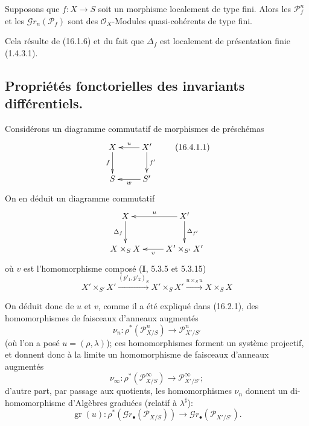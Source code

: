 \begin{proposition}[16.3.9]
\label{IV.16.3.9}
Supposons que $f:X\to S$ soit un morphisme localement de type fini. Alors les
$\mathscr{P}_f^n$ et les $\mathscr{G}r_n(\mathscr{P}_f)$ sont des
$\mathcal{O}_X$-Modules quasi-cohérents de type fini.
\end{proposition}

Cela résulte de (16.1.6) et du fait que $\Delta_f$ est localement de présentation
finie (1.4.3.1).

\subsection{Propriétés fonctorielles des invariants différentiels.}

\begin{env}[16.4.1]
\label{IV.16.4.1}
Considérons un diagramme commutatif de morphismes de préschémas
\[
  \xymatrix{
    X \ar[d]_-{f} & X' \ar[l]_-u \ar[d]^-{f'} \\
    S & S' \ar[l]^-w
  }
  \tag{16.4.1.1}
  \label{IV.16.4.1.1}
\]
On en déduit un diagramme commutatif
\[
  \xymatrix{
    X \ar[d]_-{\Delta_f} & X' \ar[l]_-u \ar[d]^-{\Delta_{f'}} \\
    X\times_S X & X'\times_{S'}X' \ar[l]^-v
  }
\]
où $v$ est l'homomorphisme composé (\textbf{I}, 5.3.5 et 5.3.15)
\[
  X'\times_{S'}X'
  \xrightarrow{(p'_1,p'_2)_S}X'\times_S X'
  \xrightarrow{u\times_S u}X\times_S X
  \tag{16.4.1.2}
  \label{IV.16.4.1.2}
\]

On déduit donc de $u$ et $v$, comme il a été expliqué dans (16.2.1), des
homomorphismes de faisceaux d'anneaux augmentés
\[
  \nu_n:\rho^*(\mathscr{P}_{X/S}^n)\longrightarrow
  \mathscr{P}_{X'/S'}^n
  \tag{16.4.1.3}
  \label{IV.16.4.1.3}
\]
(où l'on a posé $u=(\rho,\lambda)$); ces homomorphismes forment un système
projectif, et donnent donc à la limite un homomorphisme de faisceaux d'anneaux
augmentés
\[
  \nu_\infty:\rho^*(\mathscr{P}_{X/S}^\infty)\longrightarrow
  \mathscr{P}_{X'/S'}^\infty;
  \tag{16.4.1.4}
  \label{IV.16.4.1.4}
\]
d'autre part, par passage aux quotients, les homomorphismes $\nu_n$ donnent un
di-homomorphisme d'Algèbres graduées (relatif à $\lambda^\sharp$):
\[
  \operatorname{gr}(u):\rho^*(\mathscr{G}r_\bullet(\mathscr{P}_{X/S}))
  \longrightarrow\mathscr{G}r_\bullet(\mathscr{P}_{X'/S'}).
  \tag{16.4.1.5}
  \label{IV.16.4.1.5}
\]
\end{env}


